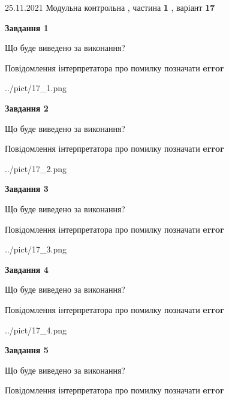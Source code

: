 \documentclass[10pt, ukrainian]{article}
\begin{document}
{25.11.2021 Модульна контрольна , частина \textbf { 1 }, варіант  \No \textbf { 17 }\par}
{
\begin {large}

{\begin {center}\textbf{Завдання 1}\end {center}}\par
Що буде виведено за виконання? \par
Повідомлення інтерпретатора про помилку позначати \textbf{error}

\begin{center}
	{../pict/17_1.png}
\end{center}
\newpage

{\begin {center}\textbf{Завдання 2}\end {center}}\par
Що буде виведено за виконання? \par
Повідомлення інтерпретатора про помилку позначати \textbf{error}

\begin{center}
	{../pict/17_2.png}
\end{center}
\newpage

{\begin {center}\textbf{Завдання 3}\end {center}}\par
Що буде виведено за виконання? \par
Повідомлення інтерпретатора про помилку позначати \textbf{error}

\begin{center}
	{../pict/17_3.png}
\end{center}
\newpage

{\begin {center}\textbf{Завдання 4}\end {center}}\par
Що буде виведено за виконання? \par
Повідомлення інтерпретатора про помилку позначати \textbf{error}

\begin{center}
	{../pict/17_4.png}
\end{center}
\newpage

{\begin {center}\textbf{Завдання 5}\end {center}}\par
Що буде виведено за виконання? \par
Повідомлення інтерпретатора про помилку позначати \textbf{error}


\end{large}}
\end{document}
